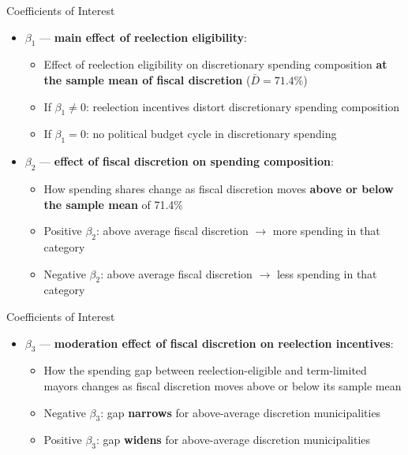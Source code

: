 \documentclass{beamer}
\begin{document}
\begin{frame}{Coefficients of Interest}
\begin{itemize}
    \item $\beta_1$ --- \textbf{main effect of reelection eligibility}:
    \begin{itemize}
        \item Effect of reelection eligibility on discretionary spending composition \textbf{at the sample mean of fiscal discretion} ($\bar{D} = 71.4\%$)
        \item If $\beta_1 \neq 0$: reelection incentives distort discretionary spending composition
        \item If $\beta_1 = 0$: no political budget cycle in discretionary spending
    \end{itemize}
    \vspace{0.5em}
    \item $\beta_2$ --- \textbf{effect of fiscal discretion on spending composition}:
    \begin{itemize}
        \item How spending shares change as fiscal discretion moves \textbf{above or below the sample mean} of 71.4\%
        \item Positive $\beta_2$: above average fiscal discretion $\rightarrow$ more spending in that category
        \item Negative $\beta_2$: above average fiscal discretion $\rightarrow$ less spending in that category
    \end{itemize}
\end{itemize}
\end{frame}

\begin{frame}{Coefficients of Interest}
\begin{itemize}
    \item $\beta_3$ --- \textbf{moderation effect of fiscal discretion on reelection incentives}:
    \begin{itemize}
        \item How the spending gap between reelection-eligible and term-limited mayors changes as fiscal discretion moves above or below its sample mean
        \item Negative $\beta_3$: gap \textbf{narrows} for above-average discretion municipalities
        \item Positive $\beta_3$: gap \textbf{widens} for above-average discretion municipalities
    \end{itemize}
\end{itemize}
\end{frame}
\end{document}
